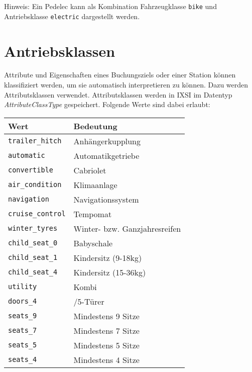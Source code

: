 Hinweis: Ein Pedelec kann als Kombination Fahrzeugklasse \verb|bike| und Antriebsklasse \verb|electric| dargestellt werden.

\section{Antriebsklassen}
Attribute und Eigenschaften eines Buchungsziels oder einer Station können klassifiziert werden, um sie automatisch interpretieren zu können. Dazu werden Attributsklassen verwendet. Attributsklassen werden in IXSI im Datentyp \emph{AttributeClassType} gespeichert. Folgende Werte sind dabei erlaubt:

\begin{flushleft}
\begin{tabularx}{\linewidth}{l>{\raggedright\arraybackslash}X} 
\toprule
Wert & Bedeutung\\
\midrule
\verb|trailer_hitch| & Anhängerkupplung\\
\verb|automatic| & Automatikgetriebe\\
\verb|convertible| & Cabriolet\\
\verb|air_condition| & Klimaanlage\\
\verb|navigation| & Navigationssystem\\
\verb|cruise_control| & Tempomat\\
\verb|winter_tyres| & Winter- bzw. Ganzjahresreifen\\
\verb|child_seat_0| & Babyschale\\
\verb|child_seat_1| & Kindersitz (9-18kg)\\
\verb|child_seat_4| & Kindersitz (15-36kg)\\
\verb|utility| & Kombi\\
\verb|doors_4| & 4/5-Türer\\
\verb|seats_9| & Mindestens 9 Sitze\\
\verb|seats_7| & Mindestens 7 Sitze\\
\verb|seats_5| & Mindestens 5 Sitze\\
\verb|seats_4| & Mindestens 4 Sitze\\
\bottomrule
\end{tabularx}
\end{flushleft}

